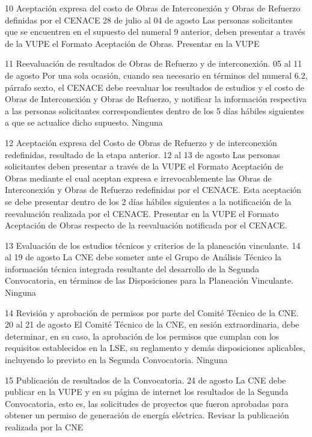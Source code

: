  10
 Aceptación expresa del costo de Obras de Interconexión y Obras de Refuerzo definidas por el CENACE
 28 de julio al 04 de agosto
 Las personas solicitantes que se encuentren en el supuesto del numeral 9 anterior, deben presentar a través de la VUPE el Formato Aceptación de Obras.
 Presentar en la VUPE 
 
 11
 Reevaluación de resultados de Obras de Refuerzo y de interconexión.
 05 al 11 de agosto
 Por una sola ocasión, cuando sea necesario en términos del numeral 6.2, párrafo sexto, el CENACE debe reevaluar los resultados de estudios y el costo de Obras de Interconexión y Obras de Refuerzo, y notificar la información respectiva a las personas solicitantes correspondientes dentro de los 5 días hábiles siguientes a que se actualice dicho supuesto.
 Ninguna
 
 12
 Aceptación expresa del Costo de Obras de Refuerzo y de interconexión redefinidas, resultado de la etapa anterior.
 12 al 13 de agosto
 Las personas solicitantes deben presentar a través de la VUPE el Formato Aceptación de Obras mediante el cual aceptan expresa e irrevocablemente las Obras de Interconexión y Obras de Refuerzo redefinidas por el CENACE. Esta aceptación se debe presentar dentro de los 2 días hábiles siguientes a la notificación de la reevaluación realizada por el CENACE.
 Presentar en la VUPE el Formato Aceptación de Obras respecto de la reevaluación notificada por el CENACE.
 
 13
 Evaluación de los estudios técnicos y criterios de la planeación vinculante.
 14 al 19 de agosto
 La CNE debe someter ante el Grupo de Análisis Técnico la información técnica integrada resultante del desarrollo de la Segunda Convocatoria, en términos de las Disposiciones para la Planeación Vinculante.
 Ninguna
 
 14
 Revisión y aprobación de permisos por parte del Comité Técnico de la CNE.
 20 al 21 de agosto
 El Comité Técnico de la CNE, en sesión extraordinaria, debe determinar, en su caso, la aprobación de los permisos que cumplan con los requisitos establecidos en la LSE, su reglamento y demás disposiciones aplicables, incluyendo lo previsto en la Segunda Convocatoria.
 Ninguna
 
 15
 Publicación de resultados de la Convocatoria.
 24 de agosto
 La CNE debe publicar en la VUPE y en su página de internet los resultados de la Segunda Convocatoria, esto es, las solicitudes de proyectos que fueron aprobadas para obtener un permiso de generación de energía eléctrica.
 Revisar la publicación realizada por la CNE
 

